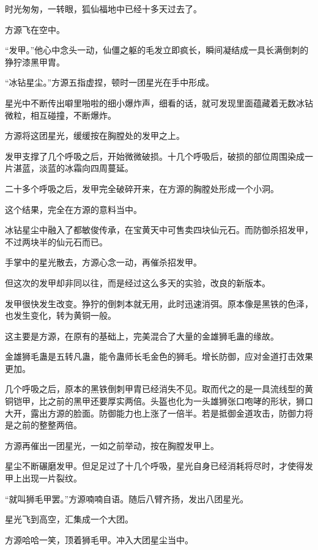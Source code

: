 
\begin{this_body}



时光匆匆，一转眼，狐仙福地中已经十多天过去了。

方源飞在空中。

“发甲。”他心中念头一动，仙僵之躯的毛发立即疯长，瞬间凝结成一具长满倒刺的狰狞漆黑甲胄。

“冰钻星尘。”方源五指虚捏，顿时一团星光在手中形成。

星光中不断传出噼里啪啦的细小爆炸声，细看的话，就可发现里面蕴藏着无数冰钻微粒，相互碰撞，不断爆炸。

方源将这团星光，缓缓按在胸膛处的发甲之上。

发甲支撑了几个呼吸之后，开始微微破损。十几个呼吸后，破损的部位周围染成一片湛蓝，淡蓝的冰霜向四周蔓延。

二十多个呼吸之后，发甲完全破碎开来，在方源的胸膛处形成一个小洞。

这个结果，完全在方源的意料当中。

冰钻星尘中融入了都敏俊传承，在宝黄天中可售卖四块仙元石。而防御杀招发甲，不过两块半的仙元石而已。

手掌中的星光散去，方源心念一动，再催杀招发甲。

但这次的发甲却非同以往，而是经过这么多天的实验，改良的新版本。

发甲很快发生改变。狰狞的倒刺本就无用，此时迅速消弭。原本像是黑铁的色泽，也发生变化，转为黄铜一般。

这主要是方源，在原有的基础上，完美混合了大量的金雄狮毛蛊的缘故。

金雄狮毛蛊是五转凡蛊，能令蛊师长毛金色的狮毛。增长防御，应对金道打击效果更加。

几个呼吸之后，原本的黑铁倒刺甲胄已经消失不见。取而代之的是一具流线型的黄铜铠甲，比之前的黑甲还要厚实两倍。头盔也化为一头雄狮张口咆哮的形状，狮口大开，露出方源的脸面。防御能力也上涨了一倍半。若是抵御金道攻击，防御力将是之前的整整两倍。

方源再催出一团星光，一如之前举动，按在胸膛发甲上。

星尘不断碾磨发甲。但足足过了十几个呼吸，星光自身已经消耗将尽时，才使得发甲上出现一片裂纹。

“就叫狮毛甲罢。”方源喃喃自语。随后八臂齐扬，发出八团星光。

星光飞到高空，汇集成一个大团。

方源哈哈一笑，顶着狮毛甲。冲入大团星尘当中。


\end{this_body}
